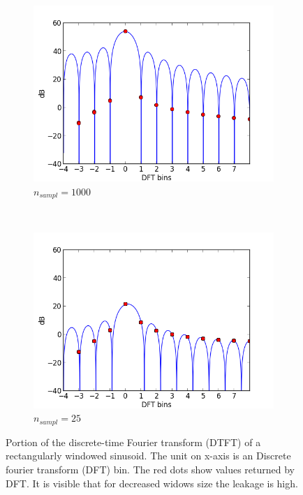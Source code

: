 \begin{figure}[h!]%
  \centering
        \begin{subfigure}[b]{0.5\textwidth}
                \centering
                \includegraphics[width=\textwidth]{img/leakage_rect_1000}
                \caption{$n_{sampl}=1000$}
                \label{fig:leakage_rect_1000}
        \end{subfigure}%
        ~ \begin{subfigure}[b]{0.5\textwidth}
                \centering
                \includegraphics[width=\textwidth]{img/leakage_rect_25}
                \caption{$n_{sampl}=25$}
                \label{fig:leakage_rect_25}
        \end{subfigure}%
  \caption{\small Portion of the discrete-time Fourier transform (DTFT) of a rectangularly
  windowed sinusoid. The unit on x-axis is an Discrete fourier transform (DFT) bin.
  The red dots show values returned by DFT. It is visible that for decreased widows size
  the leakage is high.}
  \label{fig:leakage_rect}
\end{figure}

